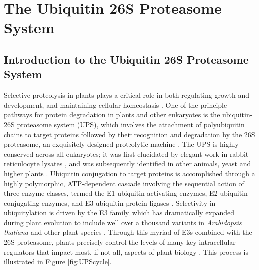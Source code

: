 \chapter{The Ubiquitin 26S Proteasome System}
\section{Introduction to the Ubiquitin 26S Proteasome System}
Selective proteolysis in plants plays a critical role in both regulating growth and development, and maintaining cellular homeostasis \citep{nelson14, smalle04, vierstra93, vierstra09}.  One of the principle pathways for protein degradation in plants and other eukaryotes is the ubiquitin-26S proteasome system (UPS), which involves the attachment of polyubiquitin chains to target proteins followed by their recognition and degradation by the 26S proteasome, an exquisitely designed proteolytic machine \citep{bhattacharyya14, finley09, vierstra09}.  The UPS is highly conserved across all eukaryotes; it was first elucidated by elegant work in rabbit reticulocyte lysates \citep{ciechanover80, ciechanover80-frAQB, etlinger77, hershko80, wilkinson80}, and was subsequently identified in other animals, yeast and higher plants \citep{ciechanover84, finley84, finley87, glotzer91, hochstrasser91, shanklin87}.  Ubiquitin conjugation to target proteins is accomplished through a highly polymorphic, ATP-dependent cascade involving the sequential action of three enzyme classes, termed the E1 ubiquitin-activating enzymes, E2 ubiquitin-conjugating enzymes, and E3 ubiquitin-protein ligases \citep{berndsen14, smalle04, vierstra09}.  Selectivity in ubiquitylation is driven by the E3 family, which has dramatically expanded during plant evolution to include well over a thousand variants in \textit{Arabidopsis thaliana} and other plant species \citep{hua13, hua11}.  Through this myriad of E3s combined with the 26S proteasome, plants precisely control the levels of many key intracellular regulators that impact most, if not all, aspects of plant biology \citep{kim13, vierstra09}. This process is illustrated in Figure \ref{fig:UPScycle}.
